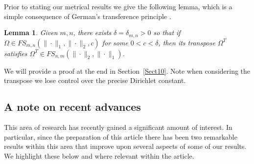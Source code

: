 \documentclass[10pt]{amsart}
\newtheorem{lemma}[theorem]{Lemma}
\theoremstyle{definition}
\begin{document}
Prior to stating our metrical results we give the following lemma, which is a simple consequence of German's transference principle \cite[Theorem 7]{german}.
 \begin{lemma} \label{Folklore transpose}
 { Given $m,n$, there exists $\delta=\delta_{m,n}>0$ so that
     if $\Omega \in FS_{m,n}(\|\cdot\|_{1},\|\cdot\|_{2}, c)$ for some $0<c<\delta$, then its transpose $\Omega^T$ satisfies $\Omega^{T} \in FS_{n,m}(\|\cdot\|_{2},\|\cdot\|_{1})$.}
 \end{lemma}

 We will provide a proof at the end in Section~\ref{Sect10}. Note when considering the transpose we lose control over the precise Dirichlet constant.
 
\subsection{A note on recent advances} \label{recentadvances}
This area of research has recently gained a significant amount of interest. In particular, since the preparation of this article there has been two remarkable results within this area that improve upon several aspects of some of our results. We highlight these below and where relevant within the article.
\end{document}
